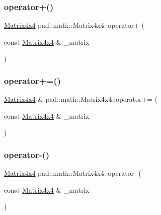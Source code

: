 \mbox{\label{structpad_1_1math_1_1_matrix4x4_acacb8a40fc9d329f40cdb6f23592e347}} 
\subsubsection{\texorpdfstring{operator+()}{operator+()}}
{\footnotesize\ttfamily \mbox{\hyperlink{structpad_1_1math_1_1_matrix4x4}{Matrix4x4}} pad\+::math\+::\+Matrix4x4\+::operator+ (\begin{DoxyParamCaption}\item[{const \mbox{\hyperlink{structpad_1_1math_1_1_matrix4x4}{Matrix4x4}} \&}]{\+\_\+matrix }\end{DoxyParamCaption})}

\mbox{\label{structpad_1_1math_1_1_matrix4x4_a41fee92ff1bcaada31a4d5ca828f5486}} 
\subsubsection{\texorpdfstring{operator+=()}{operator+=()}}
{\footnotesize\ttfamily \mbox{\hyperlink{structpad_1_1math_1_1_matrix4x4}{Matrix4x4}} \& pad\+::math\+::\+Matrix4x4\+::operator+= (\begin{DoxyParamCaption}\item[{const \mbox{\hyperlink{structpad_1_1math_1_1_matrix4x4}{Matrix4x4}} \&}]{\+\_\+matrix }\end{DoxyParamCaption})}

\mbox{\label{structpad_1_1math_1_1_matrix4x4_a15e852769583fe62d7691a9f55b15d2f}} 
\subsubsection{\texorpdfstring{operator-\/()}{operator-()}}
{\footnotesize\ttfamily \mbox{\hyperlink{structpad_1_1math_1_1_matrix4x4}{Matrix4x4}} pad\+::math\+::\+Matrix4x4\+::operator-\/ (\begin{DoxyParamCaption}\item[{const \mbox{\hyperlink{structpad_1_1math_1_1_matrix4x4}{Matrix4x4}} \&}]{\+\_\+matrix }\end{DoxyParamCaption})}

